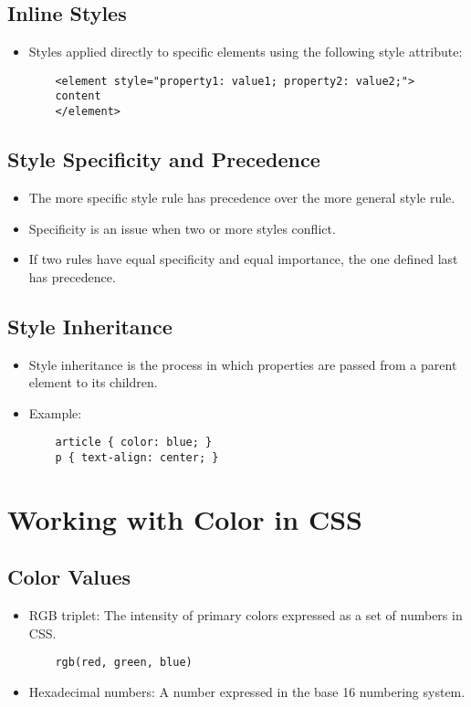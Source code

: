 \documentclass{article}
\begin{document}
\subsection{Inline Styles}
\begin{itemize}
    \item Styles applied directly to specific elements using the following style attribute:
    \begin{lstlisting}
    <element style="property1: value1; property2: value2;">
    content
    </element>
    \end{lstlisting}
\end{itemize}

\subsection{Style Specificity and Precedence}
\begin{itemize}
    \item The more specific style rule has precedence over the more general style rule.
    \item Specificity is an issue when two or more styles conflict.
    \item If two rules have equal specificity and equal importance, the one defined last has precedence.
\end{itemize}

\subsection{Style Inheritance}
\begin{itemize}
    \item Style inheritance is the process in which properties are passed from a parent element to its children.
    \item Example:
    \begin{lstlisting}
    article { color: blue; }
    p { text-align: center; }
    \end{lstlisting}
\end{itemize}

\section{Working with Color in CSS}
\subsection{Color Values}
\begin{itemize}
    \item RGB triplet: The intensity of primary colors expressed as a set of numbers in CSS.
    \begin{lstlisting}
    rgb(red, green, blue)
    \end{lstlisting}
    \item Hexadecimal numbers: A number expressed in the base 16 numbering system.
\end{itemize}
\end{document}
